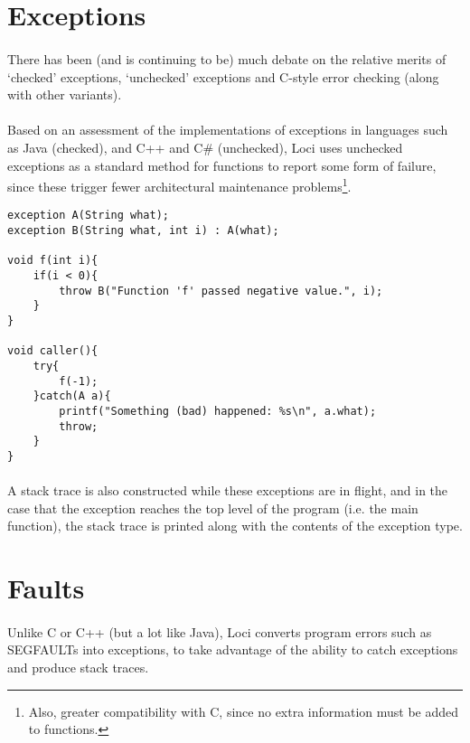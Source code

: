 \documentclass[12pt,twoside,notitlepage]{report}
\begin{document}
\section{Exceptions}

\paragraph{}
There has been (and is continuing to be) much debate on the relative merits of `checked' exceptions, `unchecked' exceptions and C-style error checking (along with other variants).

\paragraph{}
Based on an assessment of the implementations of exceptions in languages such as Java (checked), and C++ and C\# (unchecked), Loci uses unchecked exceptions as a standard method for functions to report some form of failure, since these trigger fewer architectural maintenance problems\footnote{Also, greater compatibility with C, since no extra information must be added to functions.}.

\small{
\begin{verbatim}
exception A(String what);
exception B(String what, int i) : A(what);

void f(int i){
    if(i < 0){
        throw B("Function 'f' passed negative value.", i);
    }
}

void caller(){
    try{
        f(-1);
    }catch(A a){
        printf("Something (bad) happened: %s\n", a.what);
        throw;
    }
}
\end{verbatim}
}

\paragraph{}
A stack trace is also constructed while these exceptions are in flight, and in the case that the exception reaches the top level of the program (i.e. the main function), the stack trace is printed along with the contents of the exception type.

\section{Faults}

\paragraph{}
Unlike C or C++ (but a lot like Java), Loci converts program errors such as SEGFAULTs into exceptions, to take advantage of the ability to catch exceptions and produce stack traces.
\end{document}
